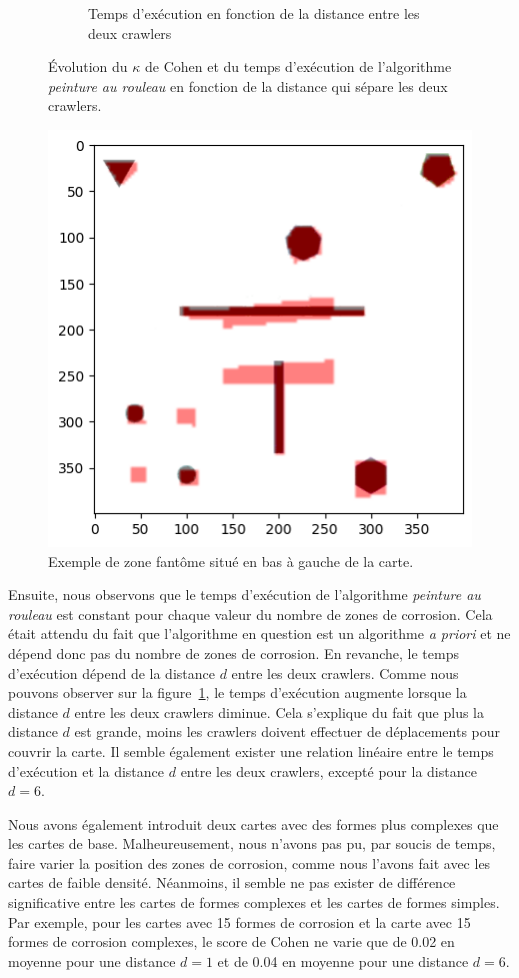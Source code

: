 \documentclass[francais,RandD]{rapportPFE}
\begin{document}
\begin{figure}[h!]
\begin{subfigure}[t]{0.49\linewidth}
						\caption{Temps d'exécution en fonction de la distance entre les deux crawlers}
						\label{fig:peinture_au_rouleau-time_vs_distance}
				\end{subfigure}
				\caption{Évolution du $\kappa$ de Cohen et du temps d'exécution de l'algorithme \textit{peinture au rouleau} en fonction de la distance qui sépare les deux crawlers.}
				\label{fig:peinture_au_rouleau-distance}
			\end{figure}

			\begin{figure}[h!]
				\centering
				\includegraphics[width=0.5\linewidth]{graphics/output.png}
				\caption{Exemple de zone fantôme situé en bas à gauche de la carte.}
				\label{fig:ghost_zone}
			\end{figure}

			Ensuite, nous observons que le temps d'exécution de l'algorithme \textit{peinture au rouleau} est constant pour chaque valeur du nombre de zones de corrosion.
			Cela était attendu du fait que l'algorithme en question est un algorithme \textit{a priori} et ne dépend donc pas du nombre de zones de corrosion.
			En revanche, le temps d'exécution dépend de la distance $d$ entre les deux crawlers.
			Comme nous pouvons observer sur la figure~\ref{fig:peinture_au_rouleau-time_vs_distance}, le temps d'exécution augmente lorsque la distance $d$ entre les deux crawlers diminue.
			Cela s'explique du fait que plus la distance $d$ est grande, moins les crawlers doivent effectuer de déplacements pour couvrir la carte.
			Il semble également exister une relation linéaire entre le temps d'exécution et la distance $d$ entre les deux crawlers, excepté pour la distance $d = 6$.

			Nous avons également introduit deux cartes avec des formes plus complexes que les cartes de base.
			Malheureusement, nous n'avons pas pu, par soucis de temps, faire varier la position des zones de corrosion, comme nous l'avons fait avec les cartes de faible densité.
			Néanmoins, il semble ne pas exister de différence significative entre les cartes de formes complexes et les cartes de formes simples.
			Par exemple, pour les cartes avec 15 formes de corrosion et la carte avec 15 formes de corrosion complexes, le score de Cohen ne varie que de 0.02 en moyenne pour une distance $d = 1$ et de 0.04 en moyenne pour une distance $d = 6$.
\end{document}
